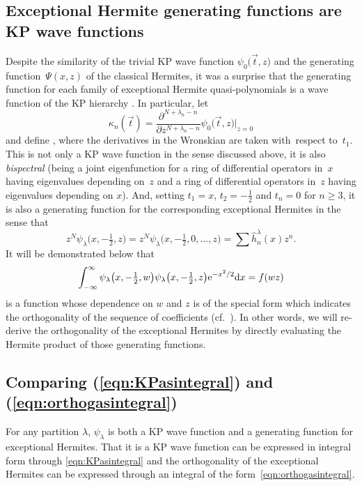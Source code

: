 \documentclass[pdftex]{sigma}
\numberwithin{equation}{section}
\theoremstyle{definition}
\def\vt{\vec{t}}
\begin{document}
\subsection{Exceptional Hermite generating functions are KP
 wave functions}\label{sec:xingrad}

Despite the similarity of the trivial KP wave function $\psi_0\bigl(\vt,z\bigr)$ and the
generating function~$\Psi(x,z)$ of the classical Hermites,
 it was a surprise that the generating function for each family of
exceptional Hermite quasi-polynomials is a wave function of the KP
hierarchy \cite{KasMil}. In particular, let
\[
\kappa_n(\vt)=\frac{\partial^{N+\lambda_n-n}}{\partial
 z^{N+\lambda_n-n}}\psi_0\bigl(\vt,z\bigr)\bigg|_{z=0}
\]
and define
\smash{$
\psi_{\lambda}\bigl(\vt,z\bigr)=\frac{\hbox{Wr}(\kappa_1,\ldots,\kappa_N,\psi_0)}{z^N\hbox{Wr}(\kappa_1,\ldots,\kappa_N)}$},
where the derivatives in the Wronskian are taken with~respect to~$t_1$.
This is not only a KP wave function in the sense discussed above, it
is also \textit{bispectral} (being a joint eigenfunction for a ring of
differential operators in~$x$ having eigenvalues depending on~$z$ and
a ring of differential operators in~$z$ having eigenvalues depending
on $x$). And, setting $t_1=x$, $t_2=-\tfrac{1}{2}$ and $t_n=0$ for $n\geq3$, it
is also a generating function for the corresponding
exceptional Hermites in the sense that
\[
z^N\psi_{\lambda}\bigl(x,-\tfrac{1}{2},z\bigr)=z^N\psi_{\lambda}\bigl(x,-\tfrac{1}{2},0,\ldots,z\bigr)=\sum \hat h^{\lambda}_n(x)z^n.
\]
 It will be demonstrated below that
 \begin{equation}
 \label{eqn:orthogasintegral}
\int_{-\infty}^{\infty}\psi_{\lambda}\bigl(x,-\tfrac{1}{2},w\bigr)
 \psi_{\lambda}\bigl(x,-\tfrac{1}{2},z\bigr){\rm e}^{-x^2/2}{\rm d}x
 =f(wz)
 \end{equation}
 is a function whose dependence on $w$ and $z$ is of the special form
 which indicates the orthogonality of the sequence of coefficients
 (cf.~\cite{twofacts}). In
 other words, we will re-derive the orthogonality of the exceptional
 Hermites by directly evaluating the Hermite product of those generating
 functions.

 \subsection{Comparing (\ref{eqn:KPasintegral}) and
 (\ref{eqn:orthogasintegral})}

For any partition $\lambda$, $\psi _{\lambda}$ is
both a KP wave function and a generating function for exceptional
Hermites. That it is a KP wave function can be expressed in integral
form through \eqref{eqn:KPasintegral} and the orthogonality of the
exceptional Hermites can be expressed through an integral of the form~\eqref{eqn:orthogasintegral}.
\end{document}
